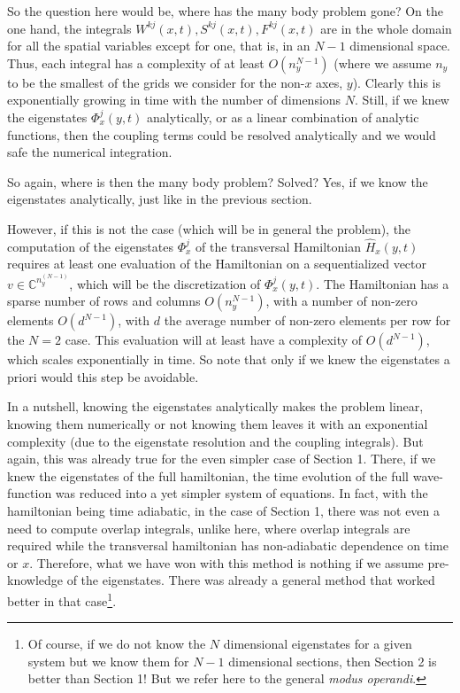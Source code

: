 \documentclass[11pt, a4paper]{article} %
\newcommand{\C}{\mathbb{C}}
\begin{document}
So the question here would be, where has the many body problem gone? On the one hand, the integrals $W^{kj}(x,t),S^{kj}(x,t),F^{kj}(x,t)$ are in the whole domain for all the spatial variables except for one, that is, in an $N-1$ dimensional space. Thus, each integral has a complexity of at least $O(n_y^{N-1})$ (where we assume $n_y$ to be the smallest of the grids we consider for the non-$x$ axes, $y$). Clearly this is exponentially growing in time with the number of dimensions $N$. Still, if we knew the eigenstates $\Phi^j_x(y,t)$ analytically, or as a linear combination of analytic functions, then the coupling terms could be resolved analytically and we would safe the numerical integration.

So again, where is then the many body problem? Solved? Yes, if we know the eigenstates analytically, just like in the previous section.

However, if this is not the case (which will be in general the problem), the computation of the eigenstates $\Phi^j_x$ of the transversal Hamiltonian $\hat{H}_x(y,t)$ requires at least one evaluation of the Hamiltonian on a sequentialized vector $v\in\C^{n_y^{(N-1)}}$, which will be the discretization of $\Phi^j_x(y,t)$. The Hamiltonian has a sparse number of rows and columns $O(n_y^{N-1})$, with a number of non-zero elements $O(d^{N-1})$, with $d$ the average number of non-zero elements per row for the $N=2$ case. This evaluation will at least have a complexity of $O(d^{N-1})$, which scales exponentially in time. So note that only if we knew the eigenstates a priori would this step be avoidable.

In a nutshell, knowing the eigenstates analytically makes the problem linear, knowing them numerically or not knowing them leaves it with an exponential complexity (due to the eigenstate resolution and the coupling integrals). But again, this was already true for the even simpler case of Section 1. There, if we knew the eigenstates of the full hamiltonian, the time evolution of the full wave-function was reduced into a yet simpler system of equations. In fact, with the hamiltonian being time adiabatic, in the case of Section 1, there was not even a need to compute overlap integrals, unlike here, where overlap integrals are required while the transversal hamiltonian has non-adiabatic dependence on time or $x$. Therefore, what we have won with this method is nothing if we assume pre-knowledge of the eigenstates. There was already a general method that worked better in that case\footnote{Of course, if we do not know the $N$ dimensional eigenstates for a given system but we know them for $N-1$ dimensional sections, then Section 2 is better than Section 1! But we refer here to the general {\em modus operandi}.}.
\end{document}
